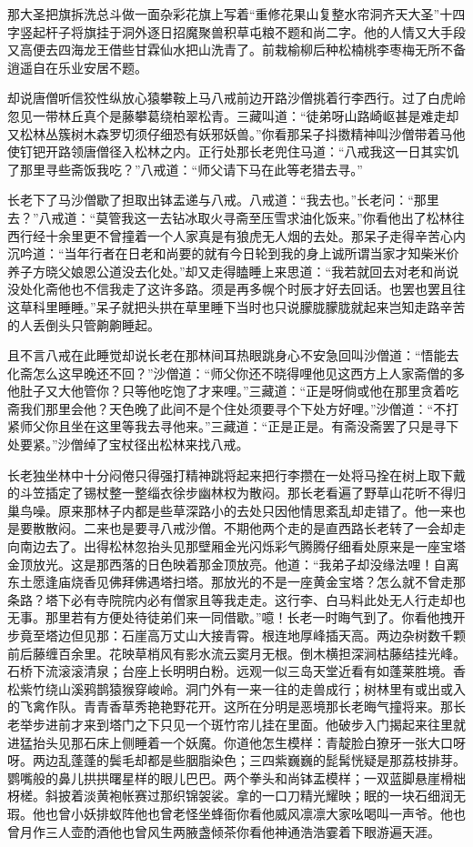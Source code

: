 \documentclass[12pt,UTF8]{ctexbook}
\begin{document}
那大圣把旗拆洗总斗做一面杂彩花旗上写着“重修花果山复整水帘洞齐天大圣”十四字竖起杆子将旗挂于洞外逐日招魔聚兽积草屯粮不题和尚二字。他的人情又大手段又高便去四海龙王借些甘霖仙水把山洗青了。前栽榆柳后种松楠桃李枣梅无所不备逍遥自在乐业安居不题。

却说唐僧听信狡性纵放心猿攀鞍上马八戒前边开路沙僧挑着行李西行。过了白虎岭忽见一带林丘真个是藤攀葛绕柏翠松青。三藏叫道：“徒弟呀山路崎岖甚是难走却又松林丛簇树木森罗切须仔细恐有妖邪妖兽。”你看那呆子抖擞精神叫沙僧带着马他使钉钯开路领唐僧径入松林之内。正行处那长老兜住马道：“八戒我这一日其实饥了那里寻些斋饭我吃？”八戒道：“师父请下马在此等老猎去寻。”

长老下了马沙僧歇了担取出钵盂递与八戒。八戒道：“我去也。”长老问：“那里去？”八戒道：“莫管我这一去钻冰取火寻斋至压雪求油化饭来。”你看他出了松林往西行经十余里更不曾撞着一个人家真是有狼虎无人烟的去处。那呆子走得辛苦心内沉吟道：“当年行者在日老和尚要的就有今日轮到我的身上诚所谓当家才知柴米价养子方晓父娘恩公道没去化处。”却又走得瞌睡上来思道：“我若就回去对老和尚说没处化斋他也不信我走了这许多路。须是再多幌个时辰才好去回话。也罢也罢且往这草科里睡睡。”呆子就把头拱在草里睡下当时也只说朦胧朦胧就起来岂知走路辛苦的人丢倒头只管齁齁睡起。

且不言八戒在此睡觉却说长老在那林间耳热眼跳身心不安急回叫沙僧道：“悟能去化斋怎么这早晚还不回？”沙僧道：“师父你还不晓得哩他见这西方上人家斋僧的多他肚子又大他管你？只等他吃饱了才来哩。”三藏道：“正是呀倘或他在那里贪着吃斋我们那里会他？天色晚了此间不是个住处须要寻个下处方好哩。”沙僧道：“不打紧师父你且坐在这里等我去寻他来。”三藏道：“正是正是。有斋没斋罢了只是寻下处要紧。”沙僧绰了宝杖径出松林来找八戒。

长老独坐林中十分闷倦只得强打精神跳将起来把行李攒在一处将马拴在树上取下戴的斗笠插定了锡杖整一整缁衣徐步幽林权为散闷。那长老看遍了野草山花听不得归巢鸟噪。原来那林子内都是些草深路小的去处只因他情思紊乱却走错了。他一来也是要散散闷。二来也是要寻八戒沙僧。不期他两个走的是直西路长老转了一会却走向南边去了。出得松林忽抬头见那壁厢金光闪烁彩气腾腾仔细看处原来是一座宝塔金顶放光。这是那西落的日色映着那金顶放亮。他道：“我弟子却没缘法哩！自离东土愿逢庙烧香见佛拜佛遇塔扫塔。那放光的不是一座黄金宝塔？怎么就不曾走那条路？塔下必有寺院院内必有僧家且等我走走。这行李、白马料此处无人行走却也无事。那里若有方便处待徒弟们来一同借歇。”噫！长老一时晦气到了。你看他拽开步竟至塔边但见那：石崖高万丈山大接青霄。根连地厚峰插天高。两边杂树数千颗前后藤缠百余里。花映草梢风有影水流云窦月无根。倒木横担深涧枯藤结挂光峰。石桥下流滚滚清泉；台座上长明明白粉。远观一似三岛天堂近看有如蓬莱胜境。香松紫竹绕山溪鸦鹊猿猴穿峻岭。洞门外有一来一往的走兽成行；树林里有或出或入的飞禽作队。青青香草秀艳艳野花开。这所在分明是恶境那长老晦气撞将来。那长老举步进前才来到塔门之下只见一个斑竹帘儿挂在里面。他破步入门揭起来往里就进猛抬头见那石床上侧睡着一个妖魔。你道他怎生模样：青靛脸白獠牙一张大口呀呀。两边乱蓬蓬的鬓毛却都是些胭脂染色；三四紫巍巍的髭髯恍疑是那荔枝排芽。鹦嘴般的鼻儿拱拱曙星样的眼儿巴巴。两个拳头和尚钵盂模样；一双蓝脚悬崖榾柮枒槎。斜披着淡黄袍帐赛过那织锦袈裟。拿的一口刀精光耀映；眠的一块石细润无瑕。他也曾小妖排蚁阵他也曾老怪坐蜂衙你看他威风凛凛大家吆喝叫一声爷。他也曾月作三人壶酌酒他也曾风生两腋盏倾茶你看他神通浩浩霎着下眼游遍天涯。
\end{document}
